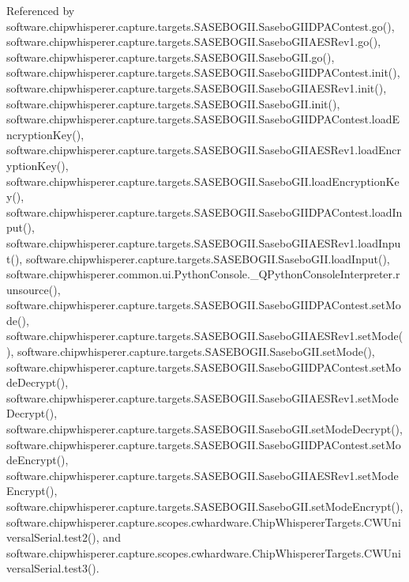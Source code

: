 Referenced by software.\+chipwhisperer.\+capture.\+targets.\+S\+A\+S\+E\+B\+O\+G\+I\+I.\+Sasebo\+G\+I\+I\+D\+P\+A\+Contest.\+go(), software.\+chipwhisperer.\+capture.\+targets.\+S\+A\+S\+E\+B\+O\+G\+I\+I.\+Sasebo\+G\+I\+I\+A\+E\+S\+Rev1.\+go(), software.\+chipwhisperer.\+capture.\+targets.\+S\+A\+S\+E\+B\+O\+G\+I\+I.\+Sasebo\+G\+I\+I.\+go(), software.\+chipwhisperer.\+capture.\+targets.\+S\+A\+S\+E\+B\+O\+G\+I\+I.\+Sasebo\+G\+I\+I\+D\+P\+A\+Contest.\+init(), software.\+chipwhisperer.\+capture.\+targets.\+S\+A\+S\+E\+B\+O\+G\+I\+I.\+Sasebo\+G\+I\+I\+A\+E\+S\+Rev1.\+init(), software.\+chipwhisperer.\+capture.\+targets.\+S\+A\+S\+E\+B\+O\+G\+I\+I.\+Sasebo\+G\+I\+I.\+init(), software.\+chipwhisperer.\+capture.\+targets.\+S\+A\+S\+E\+B\+O\+G\+I\+I.\+Sasebo\+G\+I\+I\+D\+P\+A\+Contest.\+load\+Encryption\+Key(), software.\+chipwhisperer.\+capture.\+targets.\+S\+A\+S\+E\+B\+O\+G\+I\+I.\+Sasebo\+G\+I\+I\+A\+E\+S\+Rev1.\+load\+Encryption\+Key(), software.\+chipwhisperer.\+capture.\+targets.\+S\+A\+S\+E\+B\+O\+G\+I\+I.\+Sasebo\+G\+I\+I.\+load\+Encryption\+Key(), software.\+chipwhisperer.\+capture.\+targets.\+S\+A\+S\+E\+B\+O\+G\+I\+I.\+Sasebo\+G\+I\+I\+D\+P\+A\+Contest.\+load\+Input(), software.\+chipwhisperer.\+capture.\+targets.\+S\+A\+S\+E\+B\+O\+G\+I\+I.\+Sasebo\+G\+I\+I\+A\+E\+S\+Rev1.\+load\+Input(), software.\+chipwhisperer.\+capture.\+targets.\+S\+A\+S\+E\+B\+O\+G\+I\+I.\+Sasebo\+G\+I\+I.\+load\+Input(), software.\+chipwhisperer.\+common.\+ui.\+Python\+Console.\+\_\+\+Q\+Python\+Console\+Interpreter.\+runsource(), software.\+chipwhisperer.\+capture.\+targets.\+S\+A\+S\+E\+B\+O\+G\+I\+I.\+Sasebo\+G\+I\+I\+D\+P\+A\+Contest.\+set\+Mode(), software.\+chipwhisperer.\+capture.\+targets.\+S\+A\+S\+E\+B\+O\+G\+I\+I.\+Sasebo\+G\+I\+I\+A\+E\+S\+Rev1.\+set\+Mode(), software.\+chipwhisperer.\+capture.\+targets.\+S\+A\+S\+E\+B\+O\+G\+I\+I.\+Sasebo\+G\+I\+I.\+set\+Mode(), software.\+chipwhisperer.\+capture.\+targets.\+S\+A\+S\+E\+B\+O\+G\+I\+I.\+Sasebo\+G\+I\+I\+D\+P\+A\+Contest.\+set\+Mode\+Decrypt(), software.\+chipwhisperer.\+capture.\+targets.\+S\+A\+S\+E\+B\+O\+G\+I\+I.\+Sasebo\+G\+I\+I\+A\+E\+S\+Rev1.\+set\+Mode\+Decrypt(), software.\+chipwhisperer.\+capture.\+targets.\+S\+A\+S\+E\+B\+O\+G\+I\+I.\+Sasebo\+G\+I\+I.\+set\+Mode\+Decrypt(), software.\+chipwhisperer.\+capture.\+targets.\+S\+A\+S\+E\+B\+O\+G\+I\+I.\+Sasebo\+G\+I\+I\+D\+P\+A\+Contest.\+set\+Mode\+Encrypt(), software.\+chipwhisperer.\+capture.\+targets.\+S\+A\+S\+E\+B\+O\+G\+I\+I.\+Sasebo\+G\+I\+I\+A\+E\+S\+Rev1.\+set\+Mode\+Encrypt(), software.\+chipwhisperer.\+capture.\+targets.\+S\+A\+S\+E\+B\+O\+G\+I\+I.\+Sasebo\+G\+I\+I.\+set\+Mode\+Encrypt(), software.\+chipwhisperer.\+capture.\+scopes.\+cwhardware.\+Chip\+Whisperer\+Targets.\+C\+W\+Universal\+Serial.\+test2(), and software.\+chipwhisperer.\+capture.\+scopes.\+cwhardware.\+Chip\+Whisperer\+Targets.\+C\+W\+Universal\+Serial.\+test3().


